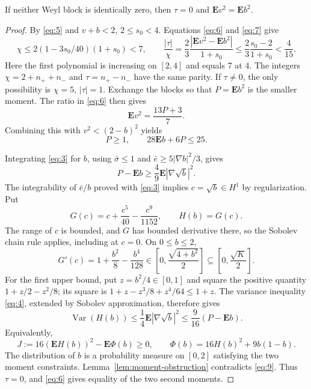 \begin{proposition}\label{prop:balanced-moments}
If neither Weyl block is identically zero, then
$\tau=0$ and $\mathbf E v^2=\mathbf E b^2$.
\end{proposition}
\begin{proof}
By \eqref{eq:5} and $v+b<2$,
$2\le s_0<4$.  Equations \eqref{eq:6} and \eqref{eq:7} give
\[
 \chi\le2(1-3s_0/40)(1+s_0)<7,
 \qquad
 \frac{|\tau|}{\chi}
 =\frac23\frac{|\mathbf E v^2-\mathbf E b^2|}{1+s_0}
 \le\frac23\frac{s_0-2}{1+s_0}<\frac4{15}.
\]
Here the first polynomial is increasing on $[2,4]$ and equals $7$ at
$4$.  The integers $\chi=2+n_++n_-$ and $\tau=n_+-n_-$ have the same
parity.  If $\tau\ne0$, the only possibility is $\chi=5$, $|\tau|=1$.
Exchange the blocks so that $P=\mathbf E b^2$ is the smaller moment.
The ratio in \eqref{eq:6} then gives
\[
 \mathbf E v^2=\frac{13P+3}{7}.
\]
Combining this with $v^2<(2-b)^2$ yields
\[
 P\ge1,\qquad28\mathbf E b+6P\le25.
\]

Integrating \eqref{eq:3} for $b$, using $\bar\sigma\le1$ and
$\bar e\ge5|\nabla b|^2/3$, gives
\[
 P-\mathbf E b\ge\frac49\mathbf E|\nabla\sqrt b|^2.
\]
The integrability of $\bar e/b$ proved with \eqref{eq:3} implies
$c=\sqrt b\in H^1$ by regularization. Put
\[
 G(c)=c+\frac{c^5}{40}-\frac{c^9}{1152},\qquad H(b)=G(c).
\]
The range of $c$ is bounded, and $G$ has bounded derivative there, so the
Sobolev chain rule applies, including at $c=0$. On $0\le b\le2$,
\[
 G'(c)=1+\frac{b^2}{8}-\frac{b^4}{128}
 \in\left[0,\frac{\sqrt{4+b^2}}2\right]
 \subseteq\left[0,\frac{\sqrt K}2\right].
\]
For the first upper bound, put $z=b^2/4\in[0,1]$ and square the positive
quantity $1+z/2-z^2/8$; its square is
$1+z-z^3/8+z^4/64\le1+z$.
The variance inequality \eqref{eq:4}, extended by Sobolev approximation,
therefore gives
\[
 \operatorname{Var}(H(b))
 \le\frac14\mathbf E|\nabla\sqrt b|^2
 \le\frac9{16}(P-\mathbf E b).
\]
Equivalently,
\[
 J:=16(\mathbf E H(b))^2-\mathbf E\Phi(b)\ge0,
 \qquad \Phi(b)=16H(b)^2+9b(1-b).
 \tag{9}\label{eq:9}
\]
The distribution of $b$ is a probability measure on $[0,2]$ satisfying
the two moment constraints.  Lemma~\ref{lem:moment-obstruction}
contradicts \eqref{eq:9}.  Thus $\tau=0$, and \eqref{eq:6} gives equality
of the two second moments.
\end{proof}
